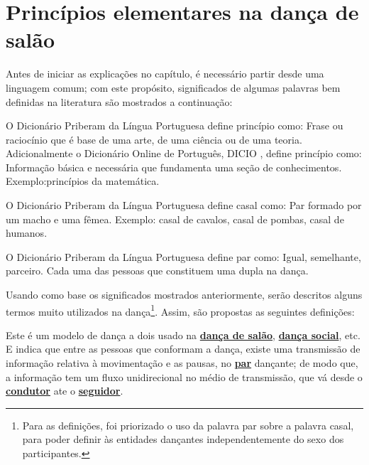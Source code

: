 
\chapter{Princípios elementares na dança de salão}

Antes de iniciar as explicações no capítulo, 
é necessário partir desde uma linguagem comum;
com este propósito, 
significados de algumas palavras bem definidas na literatura são mostrados a continuação:
 
\begin{definition}[Princípio:] 
\label{def:Principio}O Dicionário Priberam da Língua Portuguesa \cite{priberamprincipio} define princípio como:
Frase ou raciocínio que é base de uma arte, de uma ciência ou de uma teoria.
Adicionalmente o Dicionário Online de Português, DICIO \cite{dicioprincipio}, define princípio como:
Informação básica e necessária que fundamenta uma seção de conhecimentos.
Exemplo:princípios da matemática.
\end{definition}

\begin{definition}[Casal:] 
\label{def:Casal} O Dicionário Priberam da Língua Portuguesa \cite{priberamcasal} define casal como:
Par formado por um macho e uma fêmea.
Exemplo: casal de cavalos, casal de pombas, casal de humanos.
\end{definition}

\begin{definition}[Par:] 
\label{def:Par} O Dicionário Priberam da Língua Portuguesa \cite{priberampar} define par como:
Igual, semelhante, parceiro.
Cada uma das pessoas que constituem uma dupla na dança.
\end{definition}


Usando como base os significados mostrados anteriormente, 
serão descritos alguns termos muito utilizados na dança\footnote{
Para as definições, foi priorizado o uso da palavra par sobre a palavra casal,
para poder definir às entidades dançantes independentemente do sexo dos participantes.}.
Assim,  são propostas as seguintes definições:

\begin{definition} 
\label{def:ParadigmaConducao} 
Este é um modelo de dança a dois usado na \hyperref[def:DancaSalao]{\textbf{dança de salão}},
\hyperref[def:DancaSocial]{\textbf{dança social}}, etc. 
E indica que entre as pessoas que conformam a dança, 
existe uma transmissão de informação relativa à movimentação e as pausas, no \hyperref[def:Par]{\textbf{par}} dançante; 
de modo que, a informação tem um fluxo unidirecional no médio de transmissão,
que vá desde o \hyperref[def:Condutor]{\textbf{condutor}} ate o \hyperref[def:Seguidor]{\textbf{seguidor}}. 
\end{definition}

